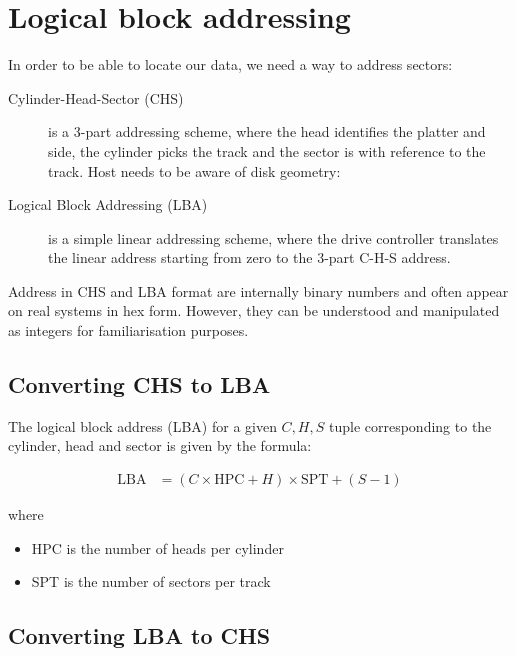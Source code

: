 \section{Logical block addressing}
\label{sec:logical-block-addressing}

In order to be able to locate our data, we need a way to address
sectors:

\begin{description}
\item[Cylinder-Head-Sector (CHS)]
is a 3-part addressing scheme, where the head identifies the platter and
side, the cylinder picks the track and the sector is with reference to
the track. Host needs to be aware of disk geometry:
\item[Logical Block Addressing (LBA)]
is a simple linear addressing scheme, where the drive controller
translates the linear address starting from zero to the 3-part C-H-S
address.
\end{description}

Address in CHS and LBA format are internally binary numbers and often
appear on real systems in hex form. However, they can be understood and
manipulated as integers for familiarisation purposes.

\subsection{Converting CHS to LBA}
\label{sec:converting-chs-to-lba}

The logical block address (LBA) for a given $C, H, S$ tuple corresponding to the cylinder, head and sector is given by the formula:

\begin{align}
  \mbox{LBA} & = ( C \times \mbox{HPC} + H ) \times \mbox{SPT} + ( S - 1 ) \label{eq:chs-to-lba}
\end{align}

where

\begin{itemize}
\item
  HPC is the number of heads per cylinder
\item
  SPT is the number of sectors per track
\end{itemize}

\subsection{Converting LBA to CHS}\label{converting-lba-to-chs}

